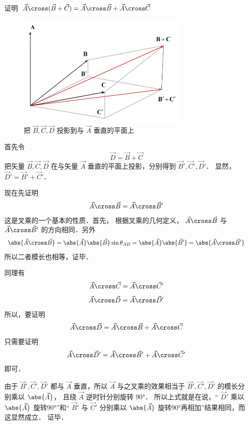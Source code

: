 
证明 $\vec A \cross (\vec B + \vec C) = \vec A \cross \vec B + \vec A \cross \vec C$ 
\begin{figure}[ht]
\vskip-10pt
\centering
\includegraphics[width=8.5cm]{./figures/CrossP.pdf}
\caption{把 $\vec B,\vec C,\vec D$ 投影到与 $\vec A$ 垂直的平面上}
\end{figure}
首先令
\begin{equation}
\vec D = \vec B + \vec C
\end{equation}
把矢量 $\vec B,\vec C,\vec D$ 在与矢量 $\vec A$ 垂直的平面上投影，分别得到 $\vec B',\vec C',\vec D'$． 显然，$\vec D'=\vec B'+\vec C'$． 

现在先证明
\begin{equation}
\vec A \cross \vec B = \vec A \cross \vec B'
\end{equation} 
这是叉乘的一个基本的性质．首先，
根据叉乘的几何定义， $\vec A \cross \vec B$ 与
 $\vec A \cross \vec B'$ 的方向相同．另外
\begin{equation}
\abs{\vec A \cross \vec B}  = \abs{\vec A} \abs{\vec B} \sin{\theta_{AB}} = \abs{\vec A} \abs{\vec B'}=\abs{\vec A \cross \vec B'}
\end{equation}
所以二者模长也相等，证毕．

同理有 
\begin{equation}
\vec A \cross \vec C = \vec A \cross \vec C'
\end{equation}
\begin{equation}
\vec A \cross \vec D = \vec A \cross \vec D'
\end{equation}
所以，要证明
\begin{equation}
\vec A \cross \vec D = \vec A \cross \vec B + \vec A \cross \vec C
\end{equation}
只需要证明
\begin{equation}
\vec A \cross \vec D' = \vec A \cross \vec B' + \vec A \cross \vec C'
\end{equation}
即可．

由于 $\vec B', \vec C', \vec D'$ 都与 $\vec A$ 垂直，所以 $\vec A$ 与之叉乘的效果相当于 $\vec B', \vec C', \vec D'$ 的模长分别乘以 $\abs {\vec A}$， 且绕 $\vec A$ 逆时针分别旋转 $90°$． 所以上式就是在说，“ $\vec D'$ 乘以 $\abs{\vec A} $ 旋转90°”和“ $\vec B'$ 与 $\vec C'$ 分别乘以 $\abs{\vec A}$ 旋转90°再相加”结果相同，而这显然成立． 证毕．




















